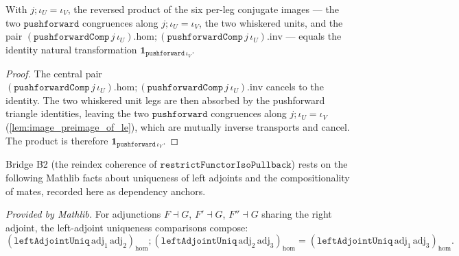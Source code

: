 \begin{lemma}
  \label{lem:pushforwardcomp_reindex_telescope}
  With \(j \mathbin{;} \iota_U = \iota_V\), the reversed product of the six per-leg conjugate images
  --- the two \(\mathtt{pushforward}\) congruences along \(j \mathbin{;} \iota_U = \iota_V\), the two
  whiskered units, and the pair
  \((\mathtt{pushforwardComp}\,j\,\iota_U).\mathrm{hom} \mathbin{;}
  (\mathtt{pushforwardComp}\,j\,\iota_U).\mathrm{inv}\) --- equals the identity natural
  transformation \(\mathbf{1}_{\mathtt{pushforward}\,\iota_V}\).
\end{lemma}
\begin{proof}
  The central pair \((\mathtt{pushforwardComp}\,j\,\iota_U).\mathrm{hom} \mathbin{;}
  (\mathtt{pushforwardComp}\,j\,\iota_U).\mathrm{inv}\) cancels to the identity. The two whiskered
  unit legs are then absorbed by the pushforward triangle identities, leaving the two
  \(\mathtt{pushforward}\) congruences along \(j \mathbin{;} \iota_U = \iota_V\)
  (\cref{lem:image_preimage_of_le}), which are mutually inverse transports and cancel. The product
  is therefore \(\mathbf{1}_{\mathtt{pushforward}\,\iota_V}\).
\end{proof}

Bridge B2 (the reindex coherence of \(\mathtt{restrictFunctorIsoPullback}\)) rests on the
following Mathlib facts about uniqueness of left adjoints and the compositionality of
mates, recorded here as dependency anchors.

\begin{lemma}
  \label{lem:adjunction_leftadjointuniq_trans}
  \mathlibok
  \textit{Provided by Mathlib.}
  For adjunctions \(F \dashv G\), \(F' \dashv G\), \(F'' \dashv G\) sharing the right adjoint, the
  left-adjoint uniqueness comparisons compose:
  \[
    (\mathtt{leftAdjointUniq}\,\mathrm{adj}_1\,\mathrm{adj}_2)_{\mathrm{hom}}
      \mathbin{;} (\mathtt{leftAdjointUniq}\,\mathrm{adj}_2\,\mathrm{adj}_3)_{\mathrm{hom}}
      = (\mathtt{leftAdjointUniq}\,\mathrm{adj}_1\,\mathrm{adj}_3)_{\mathrm{hom}}.
  \]
\end{lemma}

